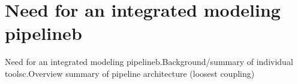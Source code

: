 \section{Need for an integrated modeling pipelineb}

Need for an integrated modeling pipelineb.Background/summary of individual toolsc.Overview summary of pipeline architecture (loosest coupling)
\Blindtext



